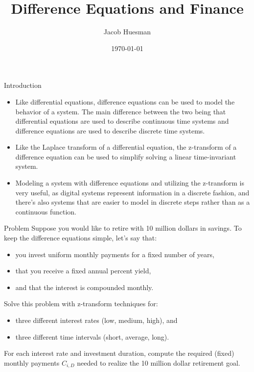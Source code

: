 \documentclass[
    orient=landscape,
    style=sailor
]{powerdot}
\author{Jacob Huesman}
\title{Difference Equations and Finance}
\date{\today}
\begin{document}
 
\maketitle
 
\begin{note}{Introduction}
  \begin{itemize}
  \item Like differential equations, difference equations can be used to model the behavior of a system. The main difference between the two being that differential equations are used to describe continuous time systems and difference equations are used to describe discrete time systems. 
  \item Like the Laplace transform of a differential equation, the z-transform of a difference equation can be used to simplify solving a linear time-invariant system. 
  \item Modeling a system with difference equations and utilizing the z-transform is very useful, as digital systems represent information in a discrete fashion, and there's also systems that are easier to model in discrete steps rather than as a continuous function.
  \end{itemize}
\end{note}

\begin{slide}{Problem}
    Suppose you would like to retire with 10 million dollars in savings. To keep the difference equations simple, let's say that:
    \begin{itemize}
    \item you invest uniform monthly payments for a fixed number of years,
    \item that you receive a fixed annual percent yield, 
    \item and that the interest is compounded monthly. 
    \end{itemize}
	Solve this problem with z-transform techniques for:
	\begin{itemize}
		\item three different interest rates (low, medium, high), and
		\item three different time intervals (short, average, long).
	\end{itemize}
	For each interest rate and investment duration, compute the required (fixed) monthly payments $C_{i,D}$ needed to realize the 10 million dollar retirement goal.
\end{slide}
\end{document}
